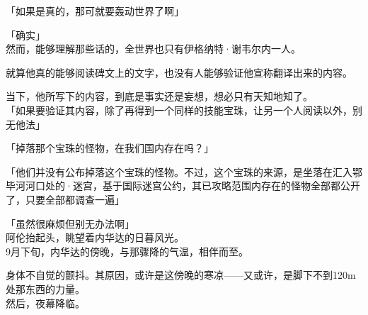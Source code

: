 「如果是真的，那可就要轰动世界了啊」

「确实」\\

然而，能够理解那些话的，全世界也只有伊格纳特·谢韦尔内一人。

就算他真的能够阅读碑文上的文字，也没有人能够验证他宣称翻译出来的内容。

当下，他所写下的内容，到底是事实还是妄想，想必只有天知地知了。\\

「如果要验证其内容，除了再得到一个同样的技能宝珠，让另一个人阅读以外，别无他法」

「掉落那个宝珠的怪物，在我们国内存在吗？」

「他们并没有公布掉落这个宝珠的怪物。不过，这个宝珠的来源，是坐落在汇入鄂毕河河口处的·迷宫，基于国际迷宫公约，其已攻略范围内存在的怪物全部都公开了，只要全部都调查一遍」

「虽然很麻烦但别无办法啊」\\

阿伦抬起头，眺望着内华达的日暮风光。\\

9月下旬，内华达的傍晚，与那骤降的气温，相伴而至。

身体不自觉的颤抖。其原因，或许是这傍晚的寒凉——又或许，是脚下不到120m处那东西的力量。\\

然后，夜幕降临。\\